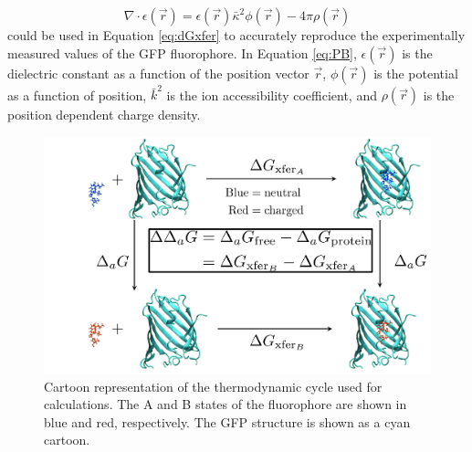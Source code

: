 \begin{equation}
    \nabla \cdot \epsilon(\vec{r}) = \epsilon(\vec{r})\bar{\kappa}^2\phi(\vec{r}) - 4\pi\rho(\vec{r})
    \label{eq:PB}
\end{equation}
could be used in Equation \ref{eq:dGxfer} to accurately reproduce the experimentally measured \pKa{} values of the GFP fluorophore. 
In Equation \ref{eq:PB}, $\epsilon(\vec{r})$ is the dielectric constant as a function of the position vector $\vec{r}$, $\phi(\vec{r})$ is the potential as a function of position, $\bar{k}^2$  is the ion accessibility coefficient, and $\rho(\vec{r})$ is the position dependent charge density. 

\begin{figure}
    \center
    \includegraphics[width=\single]{figures-gfp-pKa/thermocycle.png}
    \caption{
        Cartoon representation of the thermodynamic cycle used for \pKa{} calculations. 
        The A and B states of the fluorophore are shown in blue and red, respectively. 
        The GFP structure is shown as a cyan cartoon.
    }
    \label{fig:thermocycle}
\end{figure}

